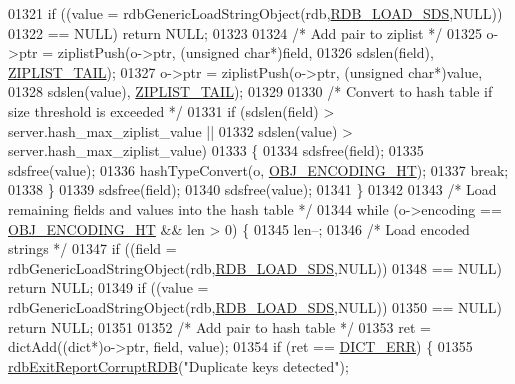 \begin{DoxyCode}
{{{{{{{{{{{{{{{{{{{{{{{01321             \textcolor{keywordflow}{if} ((value = rdbGenericLoadStringObject(rdb,\hyperlink{rdb_8h_ad15f5cc8e1a7789cc35b66f017e98a18}{RDB\_LOAD\_SDS},NULL))
01322                 == NULL) \textcolor{keywordflow}{return} NULL;
01323 
01324             \textcolor{comment}{/* Add pair to ziplist */}
01325             o->ptr = ziplistPush(o->ptr, (\textcolor{keywordtype}{unsigned} \textcolor{keywordtype}{char}*)field,
01326                     sdslen(field), \hyperlink{ziplist_8h_a25d058a2c2c0db0f131f84d23ede6ba2}{ZIPLIST\_TAIL});
01327             o->ptr = ziplistPush(o->ptr, (\textcolor{keywordtype}{unsigned} \textcolor{keywordtype}{char}*)value,
01328                     sdslen(value), \hyperlink{ziplist_8h_a25d058a2c2c0db0f131f84d23ede6ba2}{ZIPLIST\_TAIL});
01329 
01330             \textcolor{comment}{/* Convert to hash table if size threshold is exceeded */}
01331             \textcolor{keywordflow}{if} (sdslen(field) > server.hash\_max\_ziplist\_value ||
01332                 sdslen(value) > server.hash\_max\_ziplist\_value)
01333             \{
01334                 sdsfree(field);
01335                 sdsfree(value);
01336                 hashTypeConvert(o, \hyperlink{server_8h_a9c10219f68afc557d510d108257d238b}{OBJ\_ENCODING\_HT});
01337                 \textcolor{keywordflow}{break};
01338             \}
01339             sdsfree(field);
01340             sdsfree(value);
01341         \}
01342 
01343         \textcolor{comment}{/* Load remaining fields and values into the hash table */}
01344         \textcolor{keywordflow}{while} (o->encoding == \hyperlink{server_8h_a9c10219f68afc557d510d108257d238b}{OBJ\_ENCODING\_HT} && len > 0) \{
01345             len--;
01346             \textcolor{comment}{/* Load encoded strings */}
01347             \textcolor{keywordflow}{if} ((field = rdbGenericLoadStringObject(rdb,\hyperlink{rdb_8h_ad15f5cc8e1a7789cc35b66f017e98a18}{RDB\_LOAD\_SDS},NULL))
01348                 == NULL) \textcolor{keywordflow}{return} NULL;
01349             \textcolor{keywordflow}{if} ((value = rdbGenericLoadStringObject(rdb,\hyperlink{rdb_8h_ad15f5cc8e1a7789cc35b66f017e98a18}{RDB\_LOAD\_SDS},NULL))
01350                 == NULL) \textcolor{keywordflow}{return} NULL;
01351 
01352             \textcolor{comment}{/* Add pair to hash table */}
01353             ret = dictAdd((dict*)o->ptr, field, value);
01354             \textcolor{keywordflow}{if} (ret == \hyperlink{dict_8h_a6ce31f31f044b1570d335e8fa0c388c6}{DICT\_ERR}) \{
01355                 \hyperlink{rdb_8c_afb34e310c0e5dfd9f8c2bebbec59c7f7}{rdbExitReportCorruptRDB}(\textcolor{stringliteral}{"Duplicate keys detected"});
}}}}}}}}}}}}}}}}}}}}}}}
\end{DoxyCode}
